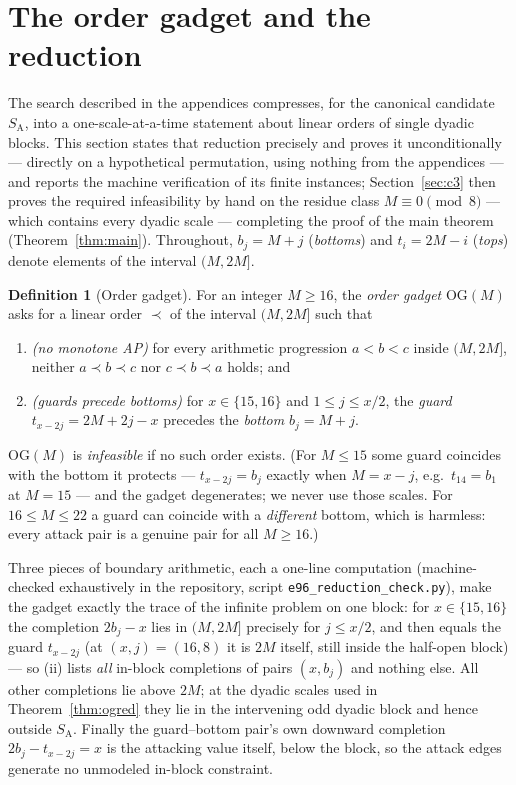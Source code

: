 \documentclass[11pt]{article}
\theoremstyle{definition}
\newtheorem{definition}[theorem]{Definition}
\newcommand{\SA}{S_{\mathrm{A}}}
\newcommand{\OG}{\mathrm{OG}}
\begin{document}
\section{The order gadget and the reduction}\label{sec:og}

The search described in the appendices compresses, for the canonical
candidate $\SA$, into a one-scale-at-a-time statement
about linear orders of single dyadic blocks. This section states that
reduction precisely and proves it unconditionally --- directly on a
hypothetical permutation, using nothing from the appendices --- and reports
the machine verification of its finite instances; Section~\ref{sec:c3} then proves the
required infeasibility by hand on the residue class $M \equiv 0 \pmod 8$
--- which contains every dyadic scale --- completing the proof of the main
theorem (Theorem~\ref{thm:main}). Throughout,
$b_j = M + j$ (\emph{bottoms}) and $t_i = 2M - i$ (\emph{tops}) denote
elements of the interval $(M, 2M]$.

\begin{definition}[Order gadget]\label{def:og}
For an integer $M \ge 16$, the \emph{order gadget} $\OG(M)$ asks for a
linear order $\prec$ of the interval $(M, 2M]$ such that
\begin{enumerate}
\item[(i)] \emph{(no monotone AP)} for every arithmetic progression
$a < b < c$ inside $(M, 2M]$, neither $a \prec b \prec c$ nor
$c \prec b \prec a$ holds; and
\item[(ii)] \emph{(guards precede bottoms)} for $x \in \{15, 16\}$ and
$1 \le j \le x/2$, the \emph{guard} $t_{x-2j} = 2M + 2j - x$ precedes
the \emph{bottom} $b_j = M + j$.
\end{enumerate}
$\OG(M)$ is \emph{infeasible} if no such order exists. (For $M \le 15$
some guard coincides with the bottom it protects --- $t_{x-2j} = b_j$
exactly when $M = x - j$, e.g.\ $t_{14} = b_1$ at $M = 15$ --- and the
gadget degenerates; we never use those scales. For $16 \le M \le 22$ a
guard can coincide with a \emph{different} bottom, which is harmless:
every attack pair is a genuine pair for all $M \ge 16$.)
\end{definition}

Three pieces of boundary arithmetic, each a one-line computation
(machine-checked exhaustively in the repository, script
\texttt{e96\_reduction\_check.py}), make the gadget exactly the trace of
the infinite problem on one block: for $x \in \{15,16\}$ the completion
$2b_j - x$ lies in $(M, 2M]$ precisely for $j \le x/2$, and then equals
the guard $t_{x-2j}$ (at $(x, j) = (16, 8)$ it is $2M$ itself, still
inside the half-open block) --- so (ii) lists \emph{all} in-block
completions of pairs $(x, b_j)$ and nothing else. All other completions
lie above $2M$; at the dyadic scales used in Theorem~\ref{thm:ogred} they
lie in the intervening odd dyadic block and hence outside $\SA$. Finally the
guard--bottom pair's own downward completion $2b_j - t_{x-2j} = x$ is the
attacking value itself, below the block, so the attack edges generate no
unmodeled in-block constraint.
\end{document}
